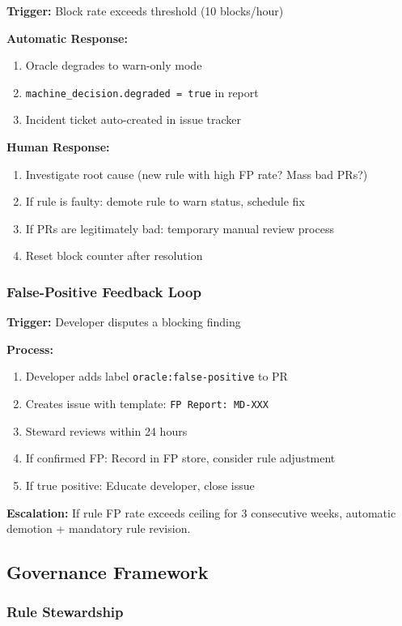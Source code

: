 \documentclass[11pt,a4paper]{article}
\begin{document}
\textbf{Trigger:} Block rate exceeds threshold (10 blocks/hour)

\textbf{Automatic Response:}
\begin{enumerate}
\item Oracle degrades to warn-only mode
\item \texttt{machine\_decision.degraded = true} in report
\item Incident ticket auto-created in issue tracker
\end{enumerate}

\textbf{Human Response:}
\begin{enumerate}
\item Investigate root cause (new rule with high FP rate? Mass bad PRs?)
\item If rule is faulty: demote rule to warn status, schedule fix
\item If PRs are legitimately bad: temporary manual review process
\item Reset block counter after resolution
\end{enumerate}

\subsubsection{False-Positive Feedback Loop}

\textbf{Trigger:} Developer disputes a blocking finding

\textbf{Process:}
\begin{enumerate}
\item Developer adds label \texttt{oracle:false-positive} to PR
\item Creates issue with template: \texttt{FP Report: MD-XXX}
\item Steward reviews within 24 hours
\item If confirmed FP: Record in FP store, consider rule adjustment
\item If true positive: Educate developer, close issue
\end{enumerate}

\textbf{Escalation:} If rule FP rate exceeds ceiling for 3 consecutive weeks, automatic demotion + mandatory rule revision.

\subsection{Governance Framework}

\subsubsection{Rule Stewardship}
\end{document}
